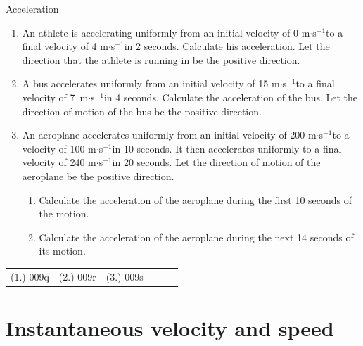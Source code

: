 \label{m38794*secfhsst!!!underscore!!!id1815}
\begin{exercises}{Acceleration }
            \noindent\vspace{-1cm}
      \label{m38794*id62523}\begin{enumerate}[noitemsep, label=\textbf{\arabic*}. ] 
            \label{m38794*uid78}\item An athlete is accelerating uniformly from an initial velocity of 0 m$\ensuremath{\cdot}$s${}^{-1}$to a final velocity of 4 m$\ensuremath{\cdot}$s${}^{-1}$in 2 seconds. Calculate his acceleration. Let the direction that the athlete is running in be the positive direction.
\label{m38794*uid79}\item A bus accelerates uniformly from an initial velocity of 15 m$\ensuremath{\cdot}$s${}^{-1}$to a final velocity of 7~m$\ensuremath{\cdot}$s${}^{-1}$in 4 seconds. Calculate the acceleration of the bus. Let the direction of motion of the bus be the positive direction.
\label{m38794*uid80}\item An aeroplane accelerates uniformly from an initial velocity of 200 m$\ensuremath{\cdot}$s${}^{-1}$to a velocity of 100 m$\ensuremath{\cdot}$s${}^{-1}$in 10 seconds. It then accelerates uniformly to a final velocity of 240 m$\ensuremath{\cdot}$s${}^{-1}$in 20 seconds. Let the direction of motion of the aeroplane be the positive direction.
\label{m38794*id68889}\begin{enumerate}[noitemsep, label=\textbf{\alph*}. ] 
            \label{m38794*uid81}\item Calculate the acceleration of the aeroplane during the first 10 seconds of the motion.
\label{m38794*uid82}\item Calculate the acceleration of the aeroplane during the next 14 seconds of its motion.
\end{enumerate}
                \end{enumerate}
  \label{m38794**end}
\par \practiceinfo
 \par \begin{tabular}[h]{cccccc}
 (1.) 009q  &  (2.) 009r  &  (3.) 009s  & \end{tabular}
\end{exercises}

\section{Instantaneous velocity and speed}

